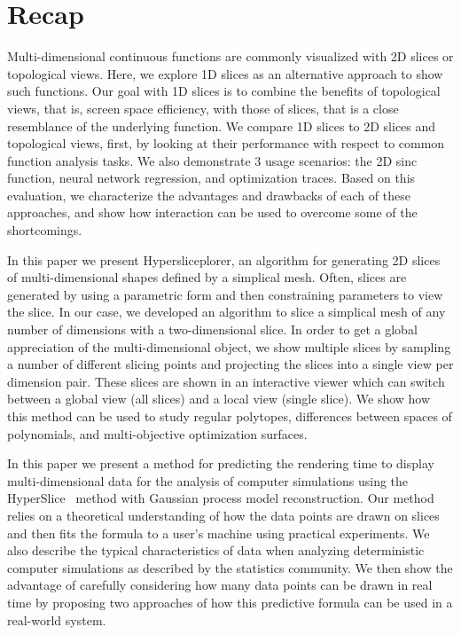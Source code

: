 
\section{Recap}



Multi-dimensional continuous functions are commonly visualized with 2D slices
or topological views. Here, we explore 1D slices as an alternative approach to
show such functions. Our goal with 1D slices is to combine the benefits of
topological views, that is, screen space efficiency, with those of slices, that
is a close resemblance of the underlying function.  We compare 1D slices to 2D
slices and topological views, first, by looking at their performance with
respect to common function analysis tasks. We also demonstrate 3 usage
scenarios: the 2D sinc function, neural network regression, and optimization
traces. Based on this evaluation, we characterize the advantages and drawbacks
of each of these approaches, and show how interaction can be used to overcome
some of the shortcomings. 


In this paper we present Hypersliceplorer, an algorithm for generating 2D
slices of multi-dimensional shapes defined by a simplical mesh.  Often, slices
are generated by using a parametric form and then constraining parameters to
view the slice. In our case, we developed an algorithm to slice a simplical
mesh of any number of dimensions with a two-dimensional slice.  In order to get
a global appreciation of the multi-dimensional object, we show multiple slices
by sampling a number of different slicing points and projecting the slices into
a single view per dimension pair. These slices are shown in an interactive
viewer which can switch between a global view (all slices) and a local view
(single slice). We show how this method can be used to study regular polytopes,
differences between spaces of polynomials, and multi-objective optimization
surfaces. 


In this paper we present a method for predicting the rendering time to display
multi-dimensional data for the analysis of computer simulations using the
HyperSlice~\cite{Wijk:1993} method with Gaussian process model reconstruction.
Our method relies on a theoretical understanding of how the data points are
drawn on slices and then fits the formula to a user's machine using practical
experiments.  We also describe the typical characteristics of data when
analyzing deterministic computer simulations as described by the statistics
community.  We then show the advantage of carefully considering how many data
points can be drawn in real time by proposing two approaches of how this
predictive formula can be used in a real-world system.

